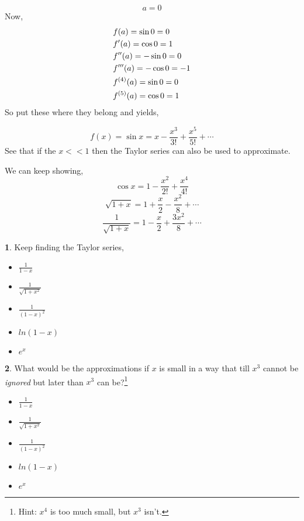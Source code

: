 \documentclass[11pt,a4paper,landscape,twocolumn]{article}
\theoremstyle{definition}
\theoremstyle{definition}
\newtheorem{pr}{ \framebox[0.05\textwidth]{{\sffamily Pr}} }
\theoremstyle{definition}
\theoremstyle{definition}
\begin{document}
\[a = 0 \]
Now, \begin{align}
& f(a) = \sin 0 = 0 \notag \\
&f'(a) =  \cos 0 = 1\notag \\
&f''(a) = -\sin 0 = 0 \notag\\
& f'''(a) = -\cos 0 = -1\notag \\
&f^{(4)} (a) = \sin 0 = 0 \notag\\
&f^{(5)} (a) = \cos 0 = 1
\end{align}
So put these where they belong and yields,

\begin{equation}
f(x)= \sin x = x - \frac{x^3}{3!} + \frac{x^5}{5!} + \cdots
\end{equation}
See that if the $x<<1$ then the Taylor series can also be used to approximate.


We can keep showing,
\begin{equation}
\cos x = 1 - \frac{x^2}{2!} + \frac{x^4}{4!}
\end{equation}
\begin{equation}
\sqrt{1 + x} =  1 + \frac{x}{2} - \frac{x^2}{8} + \cdots
\end{equation}
\begin{equation}
\frac{1}{\sqrt{1 + x}} = 1 - \frac{x}{2} + \frac{3x^2}{8} + \cdots
\end{equation}

\begin{pr}
Keep finding the Taylor series,
\begin{itemize}
\item$ \frac{1}{1-x}$
\item$ \frac{1}{\sqrt{1 + x^2}}$
\item$ \frac{1}{(1-x)^2} $
\item$ln(1-x) $
\item$ e^x$
\end{itemize}
\end{pr}
\begin{pr}
What would be the approximations if $x$ is small in a way that till $x^3$ cannot be \emph{ignored} but later than $x^3$ can be?\footnote{Hint: $x^4$ is too much small, but $x^3$ isn't.}
\begin{itemize}
\item$ \frac{1}{1-x}$
\item$ \frac{1}{\sqrt{1 + x^2}}$
\item$ \frac{1}{(1-x)^2} $
\item$ln(1-x) $
\item$ e^x$
\end{itemize}
\end{pr}
\end{document}
